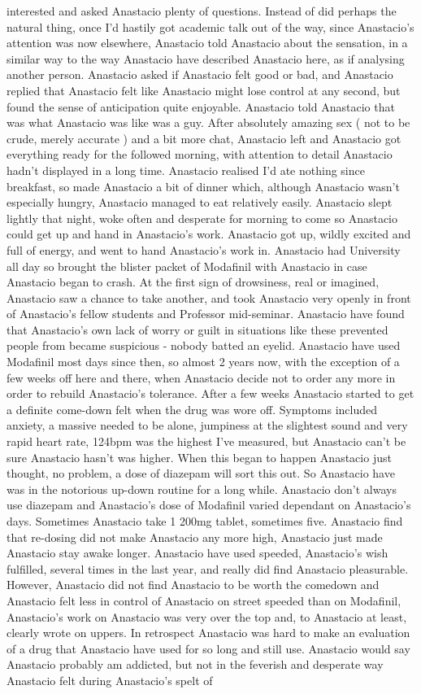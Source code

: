 \documentclass[12pt]{book}
\begin{document}
interested and asked Anastacio plenty of questions. Instead of did perhaps the natural thing, once I'd hastily got academic talk out of the way, since Anastacio's attention was now elsewhere, Anastacio told Anastacio about the sensation, in a similar way to the way Anastacio have described Anastacio here, as if analysing another person. Anastacio asked if Anastacio felt good or bad, and Anastacio replied that Anastacio felt like Anastacio might lose control at any second, but found the sense of anticipation quite enjoyable. Anastacio told Anastacio that was what Anastacio was like was a guy. After absolutely amazing sex ( not to be crude, merely accurate ) and a bit more chat, Anastacio left and Anastacio got everything ready for the followed morning, with attention to detail Anastacio hadn't displayed in a long time. Anastacio realised I'd ate nothing since breakfast, so made Anastacio a bit of dinner which, although Anastacio wasn't especially hungry, Anastacio managed to eat relatively easily. Anastacio slept lightly that night, woke often and desperate for morning to come so Anastacio could get up and hand in Anastacio's work. Anastacio got up, wildly excited and full of energy, and went to hand Anastacio's work in. Anastacio had University all day so brought the blister packet of Modafinil with Anastacio in case Anastacio began to crash. At the first sign of drowsiness, real or imagined, Anastacio saw a chance to take another, and took Anastacio very openly in front of Anastacio's fellow students and Professor mid-seminar. Anastacio have found that Anastacio's own lack of worry or guilt in situations like these prevented people from became suspicious - nobody batted an eyelid. Anastacio have used Modafinil most days since then, so almost 2 years now, with the exception of a few weeks off here and there, when Anastacio decide not to order any more in order to rebuild Anastacio's tolerance. After a few weeks Anastacio started to get a definite come-down felt when the drug was wore off. Symptoms included anxiety, a massive needed to be alone, jumpiness at the slightest sound and very rapid heart rate, 124bpm was the highest I've measured, but Anastacio can't be sure Anastacio hasn't was higher. When this began to happen Anastacio just thought, no problem, a dose of diazepam will sort this out. So Anastacio have was in the notorious up-down routine for a long while. Anastacio don't always use diazepam and Anastacio's dose of Modafinil varied dependant on Anastacio's days. Sometimes Anastacio take 1 200mg tablet, sometimes five. Anastacio find that re-dosing did not make Anastacio any more high, Anastacio just made Anastacio stay awake longer. Anastacio have used speeded, Anastacio's wish fulfilled, several times in the last year, and really did find Anastacio pleasurable. However, Anastacio did not find Anastacio to be worth the comedown and Anastacio felt less in control of Anastacio on street speeded than on Modafinil, Anastacio's work on Anastacio was very over the top and, to Anastacio at least, clearly wrote on uppers. In retrospect Anastacio was hard to make an evaluation of a drug that Anastacio have used for so long and still use. Anastacio would say Anastacio probably am addicted, but not in the feverish and desperate way Anastacio felt during Anastacio's spelt of 
\end{document}

